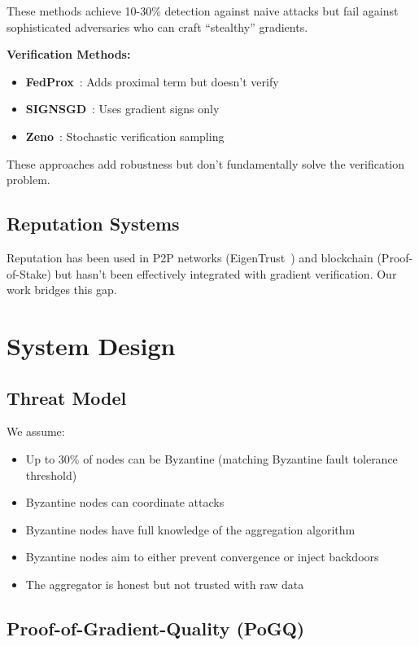 \documentclass[conference]{IEEEtran}
\begin{document}
These methods achieve 10-30\% detection against naive attacks but fail against sophisticated adversaries who can craft ``stealthy'' gradients.

\textbf{Verification Methods:}
\begin{itemize}
\item \textbf{FedProx}~\cite{li2020fedprox}: Adds proximal term but doesn't verify
\item \textbf{SIGNSGD}~\cite{bernstein2018signsgd}: Uses gradient signs only
\item \textbf{Zeno}~\cite{xie2019zeno}: Stochastic verification sampling
\end{itemize}

These approaches add robustness but don't fundamentally solve the verification problem.

\subsection{Reputation Systems}

Reputation has been used in P2P networks (EigenTrust~\cite{kamvar2003eigentrust}) and blockchain (Proof-of-Stake) but hasn't been effectively integrated with gradient verification. Our work bridges this gap.

\section{System Design}

\subsection{Threat Model}

We assume:
\begin{itemize}
\item Up to 30\% of nodes can be Byzantine (matching Byzantine fault tolerance threshold)
\item Byzantine nodes can coordinate attacks
\item Byzantine nodes have full knowledge of the aggregation algorithm
\item Byzantine nodes aim to either prevent convergence or inject backdoors
\item The aggregator is honest but not trusted with raw data
\end{itemize}

\subsection{Proof-of-Gradient-Quality (PoGQ)}
\end{document}
